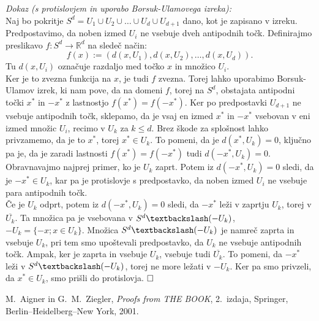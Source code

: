 \documentclass[a4paper,12pt]{article}
\def\qed{$\hfill\Box$}   %
\begin{document}
\noindent
{\em Dokaz (s protislovjem in uporabo Borsuk-Ulamovega izreka):} \\
\indent Naj bo pokritje $S^d = U_1 \cup U_2 \cup \ldots \cup U_d \cup U_{d+1}$ dano, kot je zapisano v izreku. Predpostavimo, da noben izmed $U_i$ ne vsebuje dveh antipodnih točk. Definirajmo preslikavo $f:S^d \rightarrow \mathbb{R}^d$ na sledeč način:
$$f(x) := (d(x,U_1), d(x,U_2), \ldots, d(x,U_d)).$$
Tu $d(x,U_i)$ označuje razdaljo med točko $x$ in množico $U_i$. \\
\indent Ker je to zvezna funkcija na $x$, je tudi $f$ zvezna. Torej lahko uporabimo Borsuk-Ulamov izrek, ki nam pove, da na domeni $f$, torej na $S^d$, obstajata antipodni točki $x^*$ in $-x^*$ z lastnostjo $f(x^*)=f(-x^*)$. Ker po predpostavki $U_{d+1}$ ne vsebuje antipodnih točk, sklepamo, da je vsaj en izmed $x^*$ in $-x^*$ vsebovan v eni izmed množic $U_i$, recimo v $U_k$ za $k\leq d$. Brez škode za splošnost lahko privzamemo, da je to $x^*$, torej $x^* \in U_k$. To pomeni, da je $d(x^*, U_k) = 0$, ključno pa je, da je zaradi lastnosti $f(x^*)=f(-x^*)$ tudi $d(-x^*, U_k) = 0$.\\
\indent Obravnavajmo najprej primer, ko je $U_k$ zaprt. Potem iz $d(-x^*, U_k) = 0$ sledi, da je $-x^* \in U_k$, kar pa je protislovje s predpostavko, da noben izmed $U_i$ ne vsebuje para antipodnih točk.\\
\indent Če je $U_k$ odprt, potem iz $d(-x^*, U_k) = 0$ sledi, da $-x^*$ leži v zaprtju $U_k$, torej v $\overline {U_k}$. Ta množica pa je vsebovana v $S^d\textbackslash(-U_k)$, \mbox{$-U_k = \{-x;x \in U_k\}$}. Množica $S^d\textbackslash(-U_k)$ je namreč zaprta in vsebuje $U_k$, pri tem smo upoštevali predpostavko, da $U_k$ ne vsebuje antipodnih točk. Ampak, ker je zaprta in vsebuje $U_k$, vsebuje tudi $\overline {U_k}$. To pomeni, da $-x^*$ leži v  $S^d\textbackslash(-U_k)$, torej ne more ležati v $-U_k$. Ker pa smo privzeli, da $x^* \in U_k$, smo prišli do protislovja. \qed


\begin{thebibliography}{1}

M.~Aigner in G.~M.~Ziegler, \emph{Proofs from THE BOOK}, 2.\ izdaja, Springer, Berlin--Heidelberg--New York, 2001.

\end{thebibliography}
\end{document}
